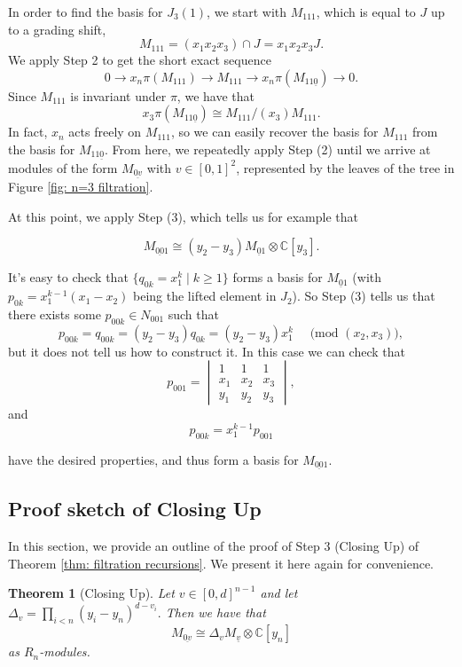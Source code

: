 \documentclass[submission]{FPSAC2027}
\newcommand{\C}{\mathbb{C}}
\newcommand{\uv}{\underline{v}}
\newcommand{\uov}{\underline{0v}}
\newtheorem{thm}{Theorem}
\begin{document}
In order to find the basis for $J_3(1)$, we start with $M_{111}$, which is equal to $J$ up to a grading shift,
$$M_{111} = (x_1 x_2x_3) \cap J = x_1x_2x_3J.$$
We apply Step 2 to get the short exact sequence
$$0 \rightarrow x_n\pi\left( M_{111}\right) \rightarrow M_{111} \rightarrow x_n \pi \left( M_{11\underline{0}}\right) \rightarrow 0.$$
Since $M_{111}$ is invariant under $\pi$, we have that
$$x_3\pi\left(M_{11\underline{0}}\right) \cong M_{111}/(x_3)M_{111}.$$
In fact, $x_n$ acts freely on $M_{111}$, so we can easily recover the basis for $M_{111}$ from the basis for $M_{11\underline{0}}$. From here, we repeatedly apply Step (2) until we arrive at modules of the form $M_{\underline{0v}}$ with $v \in [0,1]^2$, represented by the leaves of the tree in Figure \ref{fig: n=3 filtration}.

At this point, we apply Step (3), which tells us for example that

$$M_{\underline{00}1} \cong (y_2 - y_3)M_{\underline{0}1} \otimes \C[y_3].$$

It's easy to check that $\{q_{0k} = x_1^k \mid k\geq 1\}$ forms a basis for $M_{\underline{0}1}$ (with $p_{0k} = x_1^{k-1}(x_1-x_2)$ being the lifted element in $J_2$). So Step (3) tells us that there exists some $p_{00k} \in N_{001}$ such that
$$p_{00k} = q_{00k} = (y_2-y_3)q_{0k} = (y_2-y_3)x_1^k \quad \textrm{ (mod }(x_2,x_3)),$$
but it does not tell us how to construct it. In this case we can check that
$$p_{001} = 
\begin{vmatrix}
1   & 1   & 1   \\
x_1 & x_2 & x_3 \\
y_1 & y_2 & y_3
\end{vmatrix},
$$
and
$$p_{00k} = x_1^{k-1} p_{001}$$

have the desired properties, and thus form a basis for $M_{\underline{00}1}$.

\subsection{Proof sketch of Closing Up}
\label{sec: closing up}

In this section, we provide an outline of the proof of Step 3 (Closing Up) of Theorem \ref{thm: filtration recursions}. We present it here again for convenience.

\begin{thm}[Closing Up]
    \label{thm: closing up}
    Let $v \in [0,d]^{n-1}$ and let $\Delta_v = \prod_{i < n} (y_i - y_n)^{d-v_i}.$
    Then we have that
    $$M_{\uov} \cong \Delta_v M_{\uv} \otimes \C[y_n]$$
    as $R_n$-modules.
\end{thm}
\end{document}
